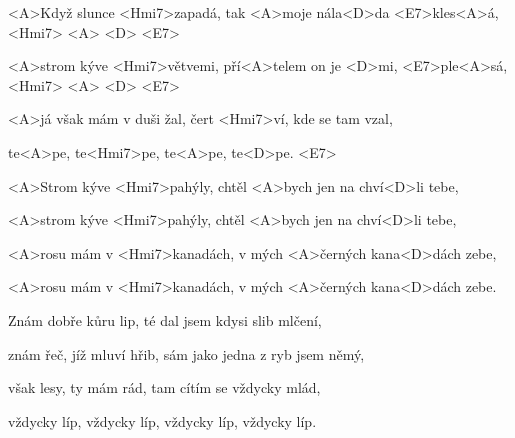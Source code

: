 

\zs
<A>Když slunce <Hmi7>zapadá, tak <A>moje nála<D>da <E7>kles<A>á, <Hmi7> <A> <D> <E7>

<A>strom kýve <Hmi7>větvemi, pří<A>telem on je <D>mi, <E7>ple<A>sá, <Hmi7> <A> <D> <E7>

<A>já však mám v duši žal, čert <Hmi7>ví, kde se tam vzal,

te<A>pe, te<Hmi7>pe, te<A>pe, te<D>pe. <E7>
\ks

\zr
<A>Strom kýve <Hmi7>pahýly, chtěl <A>bych jen na chví<D>li tebe,

<A>strom kýve <Hmi7>pahýly, chtěl <A>bych jen na chví<D>li tebe,

<A>rosu mám v <Hmi7>kanadách, v mých <A>černých kana<D>dách zebe,

<A>rosu mám v <Hmi7>kanadách, v mých <A>černých kana<D>dách zebe.
\kr

\zs
Znám dobře kůru lip, té dal jsem kdysi slib mlčení,

znám řeč, jíž mluví hřib, sám jako jedna z ryb jsem němý,

však lesy, ty mám rád, tam cítím se vždycky mlád,

vždycky líp, vždycky líp, vždycky líp, vždycky líp.
\ks

\zr
\kr

\kp
